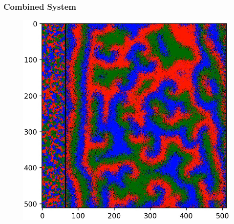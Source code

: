 \documentclass[aspectratio=169]{beamer}
\begin{document}
    \begin{frame}
        \frametitle{Combined System}
        \begin{figure}[h]
            \centering
            \vspace{-5pt}

            \includegraphics[height=\textheight]{images/plane_wave_new_2.jpg}
        \end{figure}
    \end{frame}
\end{document}
